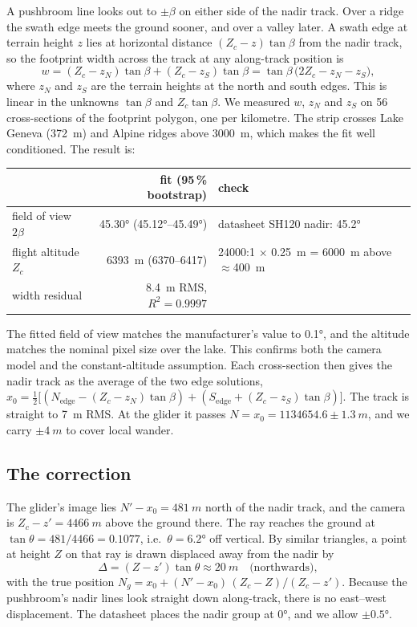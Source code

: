 \documentclass[11pt,a4paper]{article}
\begin{document}
A pushbroom line looks out to $\pm\beta$ on either side of the nadir track. Over a ridge the
swath edge meets the ground sooner, and over a valley later. A swath edge at terrain height $z$
lies at horizontal distance $(Z_c - z)\tan\beta$ from the nadir track, so the footprint width across
the track at any along-track position is
\begin{equation}
  w = (Z_c - z_N)\tan\beta + (Z_c - z_S)\tan\beta = \tan\beta\,\bigl(2Z_c - z_N - z_S\bigr),
  \label{eq:swath}
\end{equation}
where $z_N$ and $z_S$ are the terrain heights at the north and south edges. This is linear in the
unknowns $\tan\beta$ and $Z_c\tan\beta$. We measured $w$, $z_N$ and $z_S$ on 56 cross-sections of the
footprint polygon, one per kilometre. The strip crosses Lake Geneva (\SI{372}{m}) and Alpine ridges
above \SI{3000}{m}, which makes the fit well conditioned. The result is:
\begin{center}
\begin{tabular}{@{}lrl@{}}
\toprule
& fit (95\,\% bootstrap) & check \\
\midrule
field of view $2\beta$ & \ang{45.30} (\ang{45.12}--\ang{45.49}) & datasheet SH120 nadir: \ang{45.2} \\
flight altitude $Z_c$ & \SI{6393}{m} (6370--6417) & \num{24000}:1 $\times$ \SI{0.25}{m} = \SI{6000}{m} above $\approx$\SI{400}{m} \\
width residual & \SI{8.4}{m} RMS, $R^2 = 0.9997$ & \\
\bottomrule
\end{tabular}
\end{center}
The fitted field of view matches the manufacturer's value to \ang{0.1}, and the altitude matches the nominal pixel
size over the lake. This confirms both the camera model and the constant-altitude assumption. Each
cross-section then gives the nadir track as the average of the two edge solutions,
$x_0 = \tfrac12\bigl[(N_{\text{edge}} - (Z_c-z_N)\tan\beta) + (S_{\text{edge}} + (Z_c - z_S)\tan\beta)\bigr]$.
The track is straight to \SI{7}{m} RMS. At the glider it passes $N = x_0 = \num{1134654.6}\pm\SI{1.3}{m}$, and we
carry $\pm\SI{4}{m}$ to cover local wander.

\subsection{The correction}

The glider's image lies $N' - x_0 = \SI{481}{m}$ north of the nadir track, and the camera is
$Z_c - z' = \SI{4466}{m}$ above the ground there. The ray reaches the ground at
$\tan\theta = 481/4466 = 0.1077$, i.e.\ $\theta = \ang{6.2}$ off vertical. By similar triangles, a point at
height $Z$ on that ray is drawn displaced away from the nadir by
\begin{equation}
  \Delta = (Z - z')\tan\theta \approx \SI{20}{m}\quad\text{(northwards)},
  \label{eq:relief}
\end{equation}
with the true position $N_g = x_0 + (N'-x_0)\,(Z_c - Z)/(Z_c - z')$. Because the pushbroom's nadir
lines look straight down along-track, there is no east--west displacement. The datasheet places the
nadir group at \ang{0}, and we allow $\pm\ang{0.5}$.
\end{document}

